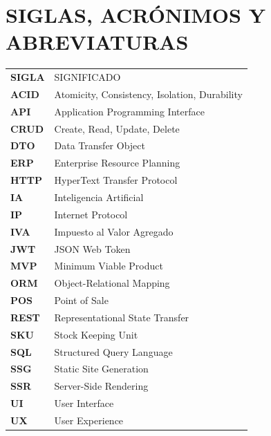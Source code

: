 \documentclass[spanish]{ieee_upb}
\begin{document}
\renewcommand{\thetable}{\Roman{table}}

\clearpage
{}
\renewcommand\listtablename{\hfill\normalfont\bfseries LISTA DE TABLAS\hfill}
\listoftables

\clearpage
\renewcommand\listfigurename{\hfill\normalfont\bfseries LISTA DE FIGURAS\hfill}
\listoffigures

\newpage
\section*{SIGLAS, ACRÓNIMOS Y ABREVIATURAS}
\begin{tabular}{l@{\hspace{2.5cm}}p{10cm}}

	\textbf{SIGLA} & SIGNIFICADO                                   \\
	\textbf{ACID}  & Atomicity, Consistency, Isolation, Durability \\
	\textbf{API}   & Application Programming Interface             \\
	\textbf{CRUD}  & Create, Read, Update, Delete                  \\
	\textbf{DTO}   & Data Transfer Object                          \\
	\textbf{ERP}   & Enterprise Resource Planning                  \\
	\textbf{HTTP}  & HyperText Transfer Protocol                   \\
	\textbf{IA}    & Inteligencia Artificial                       \\
	\textbf{IP}    & Internet Protocol                             \\
	\textbf{IVA}   & Impuesto al Valor Agregado                    \\
	\textbf{JWT}   & JSON Web Token                                \\
	\textbf{MVP}   & Minimum Viable Product                        \\
	\textbf{ORM}   & Object-Relational Mapping                     \\
	\textbf{POS}   & Point of Sale                                 \\
	\textbf{REST}  & Representational State Transfer               \\
	\textbf{SKU}   & Stock Keeping Unit                            \\
	\textbf{SQL}   & Structured Query Language                     \\
	\textbf{SSG}   & Static Site Generation                        \\
	\textbf{SSR}   & Server-Side Rendering                         \\
	\textbf{UI}    & User Interface                                \\
	\textbf{UX}    & User Experience                               \\
\end{tabular}
\end{document}
